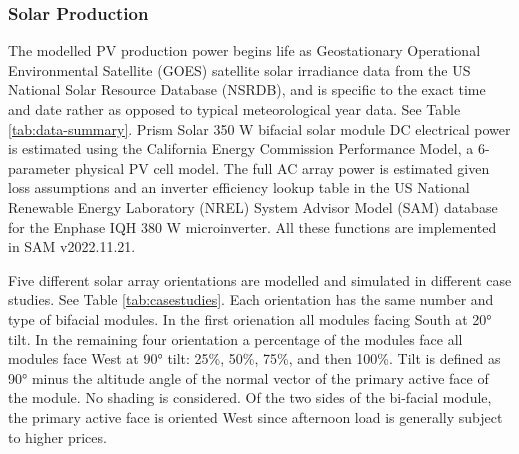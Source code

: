 \documentclass[journal,article,submit,pdftex,moreauthors]{Definitions/mdpi}
\begin{document}
\subsubsection{Solar Production}\label{solar-production}%

The modelled PV production power begins life as Geostationary
Operational Environmental Satellite (GOES) satellite solar irradiance
data from the US National Solar Resource Database (NSRDB), and is
specific to the exact time and date rather as opposed to typical
meteorological year data. See Table \ref{tab:data-summary}. Prism Solar 350 W bifacial solar module DC
electrical power is estimated using the California Energy Commission
Performance Model, a 6-parameter physical PV cell model. The full AC
array power is estimated given loss assumptions and an inverter
efficiency lookup table in the US National Renewable Energy Laboratory
(NREL) System Advisor Model (SAM) database for the Enphase IQH 380 W
microinverter. All these functions are implemented in SAM v2022.11.21.

Five different solar array orientations are modelled and simulated in
different case studies. See Table \ref{tab:casestudies}. Each orientation has the same number and type of bifacial
modules. In the first orienation all modules facing South at 20° tilt. In the remaining four
orientation a percentage of the modules face all modules face West at 90° tilt: 25\%, 50\%, 75\%, and then 100\%.
Tilt is defined as 90° minus the altitude angle of the normal vector of the primary active face of 
the module. No shading is considered. Of the two sides of the bi-facial module, the primary active 
face is oriented West since afternoon load is generally subject to higher prices.
\end{document}
